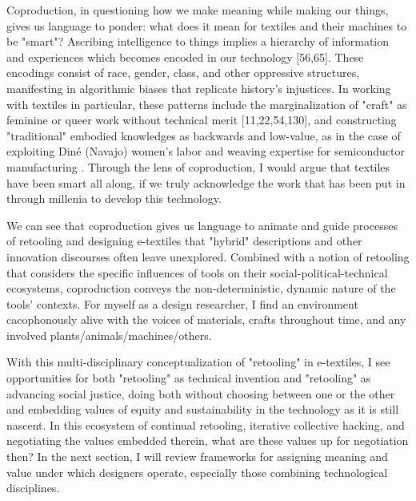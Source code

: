 Coproduction, in questioning how we make meaning while making our things, gives us language to ponder: what does it mean for textiles and their machines to be "smart"? Ascribing intelligence to things implies a hierarchy of information and experiences which becomes encoded in our technology [56,65]. These encodings consist of race, gender, class, and other oppressive structures, manifesting in algorithmic biases that replicate history's injustices. In working with textiles in particular, these patterns include the marginalization of "craft" as feminine or queer work without technical merit [11,22,54,130], and constructing "traditional" embodied knowledges as backwards and low-value, as in the case of exploiting Diné (Navajo) women's labor and weaving expertise for semiconductor manufacturing \cite{nakamura_indigenous_2014}. Through the lens of coproduction, I would argue that textiles have been smart all along, if we truly acknowledge the work that has been put in through millenia to develop this technology.

We can see that coproduction gives us language to animate and guide processes of retooling and designing e-textiles that "hybrid" descriptions and other innovation discourses often leave unexplored. Combined with a notion of retooling that considers the specific influences of tools on their social-political-technical ecosystems, coproduction conveys the non-deterministic, dynamic nature of the tools' contexts. For myself as a design researcher, I find an environment cacophonously alive with the voices of materials, crafts throughout time, and any involved plants/animals/machines/others. 



With this multi-disciplinary conceptualization of "retooling" in e-textiles, I see opportunities for both "retooling" as technical invention and "retooling" as advancing social justice, doing both without choosing between one or the other and embedding values of equity and sustainability in the technology as it is still nascent. In this ecosystem of continual retooling, iterative collective hacking, and negotiating the values embedded therein, what are these values up for negotiation then? In the next section, I will review frameworks for assigning meaning and value under which designers operate, especially those combining technological disciplines.
